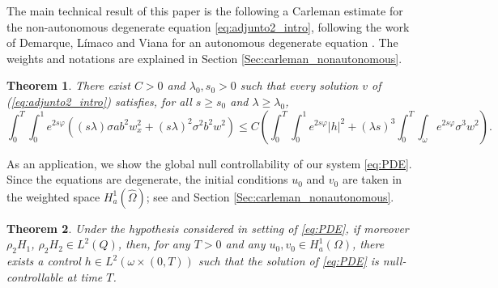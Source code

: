 \documentclass[11pt,oneside,a4papper]{osajnl}
\newtheorem{teo}{Theorem}
\newtheorem{propo}{Proposition}
\begin{document}
The main technical result of this paper is the following a Carleman estimate for the non-autonomous degenerate equation \eqref{eq:adjunto2_intro}, following the work of Demarque, Límaco and Viana for an autonomous degenerate equation \cite{DemarqueLimacoViana_deg_eq2018}. The weights and notations are explained in Section \ref{Sec:carleman_nonautonomous}.

\begin{teo}
\label{prop_carleman_1-intro}
	There exist $C>0$ and $\lambda_0,  s_0>0$ such that every solution $v$ of (\ref{eq:adjunto2_intro}) satisfies, for all
	$s\geq s_0$ and $\lambda\geq \lambda_0$,
	\begin{equation}\label{ecjv34_intro}
		\int_{0}^{T}\int_{0}^{1}e^{2s\varphi}\left(  (s\lambda)\sigma a b^2 w_x^2+(s\lambda)^2\sigma^2b^2 w^2 \right)\leq C\left(	\int_{0}^{T}\int_{0}^{1} e^{2s\varphi} |h|^2+(\lambda s)^3\int_{0}^{T}\int_{\omega}e^{2s\varphi} \sigma^3  w^2  \right).
	\end{equation}
\end{teo}

As an application, we show the global null controllability of our system \eqref{eq:PDE}. Since the equations are degenerate, the initial conditions $u_0$ and $v_0$ are taken in the weighted space $H_a^1(\hat \Omega)$; see \cite{Alabau_cannarsa_fragnelli-06} and Section \ref{Sec:carleman_nonautonomous}.

\begin{teo}
\label{thm:local_null_controllability}
Under the hypothesis considered in setting of \eqref{eq:PDE}, if moreover 
$\rho_2 H_1$, $\rho_2 H_2 \in L^2(Q)$, 
then, for any $T>0$ and any $u_0, v_0 \in H_a^1(\Omega)$, 
there exists a control $h \in L^2(\omega \times (0,T))$ such that the solution of \eqref{eq:PDE} is null-controllable at time $T$.
\end{teo}


\end{document}
